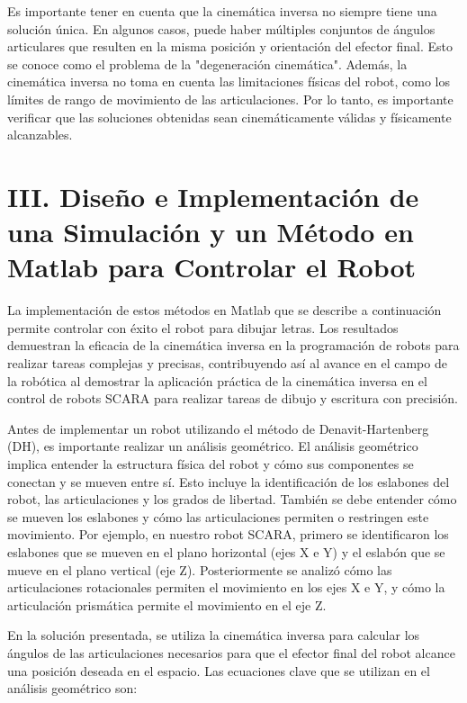 \documentclass[final]{foresj}
\begin{document}
Es importante tener en cuenta que la cinemática inversa no siempre tiene una solución única. En algunos casos, puede haber múltiples conjuntos de ángulos articulares que resulten en la misma posición y orientación del efector final. Esto se conoce como el problema de la "degeneración cinemática". Además, la cinemática inversa no toma en cuenta las limitaciones físicas del robot, como los límites de rango de movimiento de las articulaciones. Por lo tanto, es importante verificar que las soluciones obtenidas sean cinemáticamente válidas y físicamente alcanzables.

\section{III. Diseño e Implementación de una Simulación y un Método en Matlab para Controlar el Robot}

La implementación de estos métodos en Matlab que se describe a continuación permite controlar con éxito el robot para dibujar letras. Los resultados demuestran la eficacia de la cinemática inversa en la programación de robots para realizar tareas complejas y precisas, contribuyendo así al avance en el campo de la robótica al demostrar la aplicación práctica de la cinemática inversa en el control de robots SCARA para realizar tareas de dibujo y escritura con precisión.

Antes de implementar un robot utilizando el método de Denavit-Hartenberg (DH), es importante realizar un análisis geométrico. El análisis geométrico implica entender la estructura física del robot y cómo sus componentes se conectan y se mueven entre sí. Esto incluye la identificación de los eslabones del robot, las articulaciones y los grados de libertad. También se debe entender cómo se mueven los eslabones y cómo las articulaciones permiten o restringen este movimiento. Por ejemplo, en nuestro robot SCARA, primero se identificaron los eslabones que se mueven en el plano horizontal (ejes X e Y) y el eslabón que se mueve en el plano vertical (eje Z). Posteriormente se analizó cómo las articulaciones rotacionales permiten el movimiento en los ejes X e Y, y cómo la articulación prismática permite el movimiento en el eje Z.

En la solución presentada, se utiliza la cinemática inversa para calcular los ángulos de las articulaciones necesarios para que el efector final del robot alcance una posición deseada en el espacio. Las ecuaciones clave que se utilizan en el análisis geométrico son:
\end{document}
